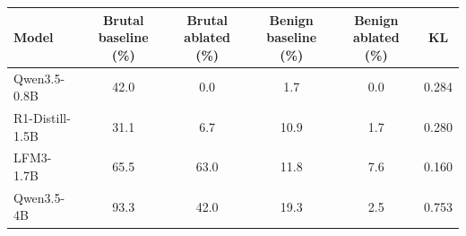 \begin{tabular}{lccccc}
\toprule
Model & Brutal baseline (\%) & Brutal ablated (\%) & Benign baseline (\%) & Benign ablated (\%) & KL \\
\midrule
Qwen3.5-0.8B & 42.0 & 0.0 & 1.7 & 0.0 & 0.284 \\
R1-Distill-1.5B & 31.1 & 6.7 & 10.9 & 1.7 & 0.280 \\
LFM3-1.7B & 65.5 & 63.0 & 11.8 & 7.6 & 0.160 \\
Qwen3.5-4B & 93.3 & 42.0 & 19.3 & 2.5 & 0.753 \\
\bottomrule
\end{tabular}